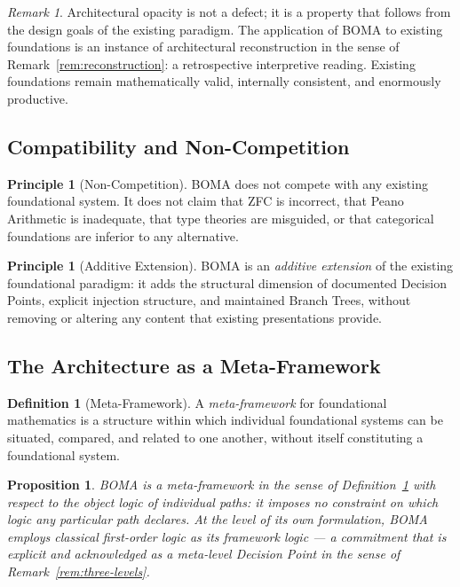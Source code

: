 \documentclass[12pt, a4paper]{article}
\theoremstyle{plain}
\newtheorem{proposition}[theorem]{Proposition}
\theoremstyle{definition}
\newtheorem{definition}[theorem]{Definition}
\newtheorem{principle}[theorem]{Principle}
\theoremstyle{remark}
\newtheorem{remark}[theorem]{Remark}
\newcommand{\BOMA}{\textsf{BOMA}}
\begin{document}
\begin{remark}
Architectural opacity is not a defect; it is a property that follows
from the design goals of the existing paradigm. The application of
\BOMA{} to existing foundations is an instance of architectural
reconstruction in the sense of Remark~\ref{rem:reconstruction}: a
retrospective interpretive reading. Existing foundations remain
mathematically valid, internally consistent, and enormously productive.
\end{remark}

\subsection{Compatibility and Non-Competition}
\label{subsec:compatibility}

\begin{principle}[Non-Competition]
\label{prin:noncompetition}
\BOMA{} does not compete with any existing foundational system. It does
not claim that ZFC is incorrect, that Peano Arithmetic is inadequate,
that type theories are misguided, or that categorical foundations are
inferior to any alternative.
\end{principle}

\begin{principle}[Additive Extension]
\label{prin:additive}
\BOMA{} is an \emph{additive extension} of the existing foundational
paradigm: it adds the structural dimension of documented Decision
Points, explicit injection structure, and maintained Branch Trees,
without removing or altering any content that existing presentations
provide.
\end{principle}

\subsection{The Architecture as a Meta-Framework}
\label{subsec:meta}

\begin{definition}[Meta-Framework]
\label{def:meta}
A \emph{meta-framework} for foundational mathematics is a structure
within which individual foundational systems can be situated, compared,
and related to one another, without itself constituting a foundational
system.
\end{definition}

\begin{proposition}
\label{prop:meta}
\BOMA{} is a meta-framework in the sense of Definition~\ref{def:meta}
with respect to the \emph{object logic} of individual paths: it imposes
no constraint on which logic any particular path declares. At the level
of its own formulation, \BOMA{} employs classical first-order logic as
its framework logic --- a commitment that is explicit and acknowledged
as a meta-level Decision Point in the sense of Remark~\ref{rem:three-levels}.
\end{proposition}
\end{document}
